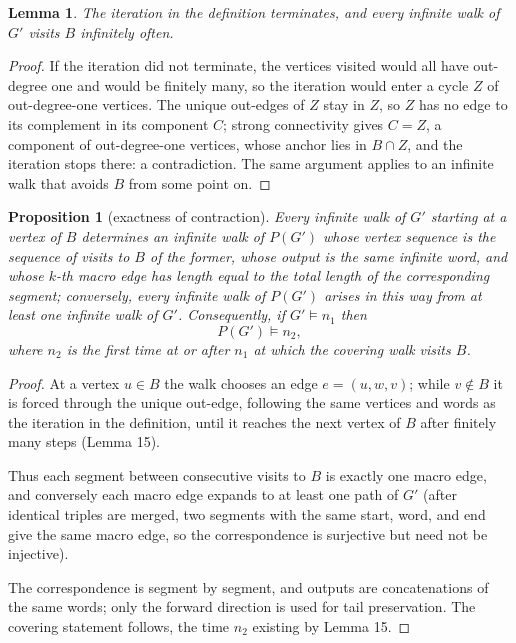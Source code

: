 \documentclass[11pt,reqno]{amsart}
\newtheorem{lemma}[theorem]{Lemma}
\newtheorem{proposition}[theorem]{Proposition}
\theoremstyle{definition}
\theoremstyle{remark}
\begin{document}
\begin{samepage}
\begin{lemma}\leavevmode\label{thm:15}
The iteration in the definition terminates, and every
infinite walk of \(G'\) visits \(B\) infinitely often.
\label{thm-end:15}
\end{lemma}
\end{samepage}

\begin{proof}\leavevmode\label{proof:15}
If the iteration did not terminate, the vertices visited would
all have out-degree one and would be finitely many, so the iteration would
enter a cycle \(Z\) of out-degree-one vertices. The unique out-edges of
\(Z\) stay in \(Z\), so \(Z\) has no edge to its complement in its
component \(C\); strong connectivity gives \(C=Z\), a component of
out-degree-one vertices, whose anchor lies in \(B\cap Z\), and the
iteration stops there: a contradiction. The same argument applies to an
infinite walk that avoids \(B\) from some point on. \qedhere
\end{proof}

\begin{samepage}
\begin{proposition}[exactness of contraction]\leavevmode\label{thm:16}
Every infinite walk of
\(G'\) starting at a vertex of \(B\) determines an infinite walk of
\(P(G')\) whose vertex sequence is the sequence of visits to \(B\) of
the former, whose output is the same infinite word, and whose \(k\)-th
macro edge has length equal to the total length of the corresponding
segment; conversely, every infinite walk of \(P(G')\) arises in this way
from at least one infinite walk of \(G'\). Consequently, if \(G'\models n_1\) then
\[
P(G')\models n_2,
\]
where \(n_2\) is the first time at or after
\(n_1\) at which the covering walk visits \(B\).
\label{thm-end:16}
\end{proposition}
\end{samepage}

\begin{proof}\leavevmode\label{proof:16}
At a vertex \(u\in B\) the walk chooses an edge
\(e=(u,w,v)\); while \(v\notin B\) it is forced through the unique
out-edge, following the same vertices and words as the iteration in the
definition, until it reaches the next vertex of \(B\) after finitely many
steps (Lemma 15).

Thus each segment between consecutive visits to \(B\)
is exactly one macro edge, and conversely each macro edge expands to at
least one path of \(G'\) (after identical triples are merged, two
segments with the same start, word, and end give the same macro edge, so
the correspondence is surjective but need not be injective).

The
correspondence is segment by segment, and outputs are concatenations of
the same words; only the forward direction is used for tail
preservation. The covering statement follows,
the time \(n_2\) existing by Lemma 15. \qedhere
\end{proof}
\end{document}
